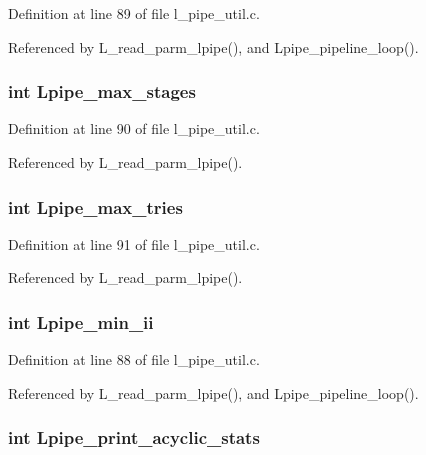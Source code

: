 Definition at line 89 of file l\_\-pipe\_\-util.c.

Referenced by L\_\-read\_\-parm\_\-lpipe(), and Lpipe\_\-pipeline\_\-loop().
\subsubsection{\setlength{\rightskip}{0pt plus 5cm}int \bf{Lpipe\_\-max\_\-stages}}\label{l__pipe__util_8h_d36c8bdff7baceb8d1cb7853c908bf03}




Definition at line 90 of file l\_\-pipe\_\-util.c.

Referenced by L\_\-read\_\-parm\_\-lpipe().
\subsubsection{\setlength{\rightskip}{0pt plus 5cm}int \bf{Lpipe\_\-max\_\-tries}}\label{l__pipe__util_8h_b20efb4ff31868be5a5b0c3039351158}




Definition at line 91 of file l\_\-pipe\_\-util.c.

Referenced by L\_\-read\_\-parm\_\-lpipe().
\subsubsection{\setlength{\rightskip}{0pt plus 5cm}int \bf{Lpipe\_\-min\_\-ii}}\label{l__pipe__util_8h_05fca7cb5ae9510942db3f6c0307a355}




Definition at line 88 of file l\_\-pipe\_\-util.c.

Referenced by L\_\-read\_\-parm\_\-lpipe(), and Lpipe\_\-pipeline\_\-loop().
\subsubsection{\setlength{\rightskip}{0pt plus 5cm}int \bf{Lpipe\_\-print\_\-acyclic\_\-stats}}\label{l__pipe__util_8h_b7eb5faa7f39fb7bfa2b757370855a9a}



